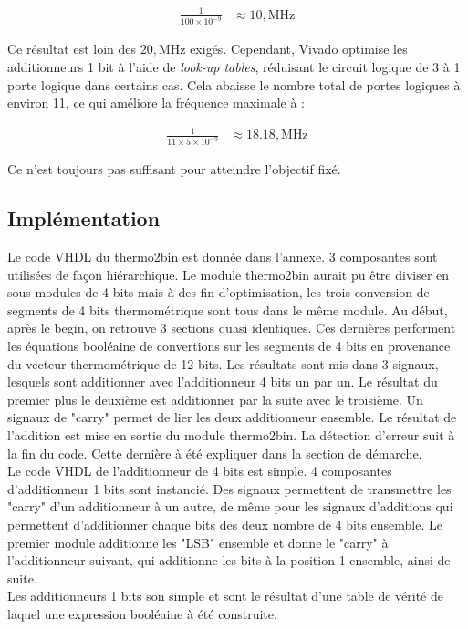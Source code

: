 \documentclass[a11paper]{article}
\begin{document}
\begin{align}
	\frac{1}{100 \times 10^{-9}} & \approx 10,\text{MHz}
\end{align}

Ce résultat est loin des $20,\text{MHz}$ exigés. Cependant, Vivado optimise les additionneurs 1 bit à l’aide de \textit{look-up tables}, réduisant le circuit logique de 3 à 1 porte logique dans certains cas. Cela abaisse le nombre total de portes logiques à environ 11, ce qui améliore la fréquence maximale à :

\begin{align}
	\frac{1}{11 \times 5 \times 10^{-9}} & \approx 18.18,\text{MHz}
\end{align}

Ce n’est toujours pas suffisant pour atteindre l’objectif fixé.

\subsection{Implémentation}
Le code VHDL du thermo2bin est donnée dans l'annexe. 3 composantes sont utilisées de façon hiérarchique. Le module thermo2bin aurait pu
être diviser en sous-modules de 4 bits mais à des fin d'optimisation, les trois conversion de segments de 4 bits thermométrique sont tous
dans le même module. Au début, après le begin, on retrouve 3 sections quasi identiques. Ces dernières performent les équations booléaine
de convertions sur les segments de 4 bits en provenance du vecteur thermométrique de 12 bits. Les résultats sont mis dans 3 signaux,
lesquels sont additionner avec l'additionneur 4 bits un par un. Le résultat du premier plus le deuxième est additionner par la suite avec
le troisième. Un signaux de "carry" permet de lier les deux additionneur ensemble. Le résultat de l'addition est mise en sortie du module
thermo2bin. La détection d'erreur suit à la fin du code. Cette dernière à été expliquer dans la section de démarche.
\\
Le code VHDL de l'additionneur de 4 bits est simple. 4 composantes d'additionneur 1 bits sont instancié. Des signaux permettent de
transmettre les "carry" d'un additionneur à un autre, de même pour les signaux d'additions qui permettent d'additionner chaque bits des
deux nombre de 4 bits ensemble. Le premier module additionne les "LSB" ensemble et donne le "carry" à l'additionneur suivant, qui additionne
les bits à la position 1 ensemble, ainsi de suite.
\\
Les additionneurs 1 bits son simple et sont le résultat d'une table de vérité de laquel une expression booléaine à été construite.
\end{document}
